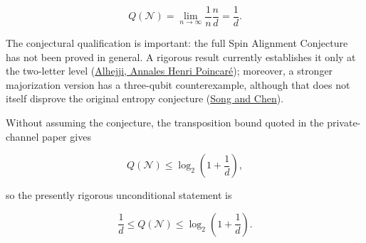 \[
Q(\mathcal N) = \lim_{n\to\infty}\frac{1}{n}\frac{n}{d} = \frac{1}{d}.
\]

The conjectural qualification is important: the full Spin Alignment Conjecture has not been proved in general. A rigorous result currently establishes it only at the two-letter level (\href{\detokenize{https://link.springer.com/article/10.1007/s00023-025-01592-w}}{Alhejji, Annales Henri Poincaré}); moreover, a stronger majorization version has a three-qubit counterexample, although that does not itself disprove the original entropy conjecture (\href{\detokenize{https://arxiv.org/abs/2603.25410}}{Song and Chen}).

Without assuming the conjecture, the transposition bound quoted in the private-channel paper gives

\[
Q(\mathcal N)\leq \log_2\left(1+\frac1d\right),
\]

so the presently rigorous unconditional statement is

\[
\frac1d \leq Q(\mathcal N) \leq \log_2\left(1+\frac1d\right).
\]
